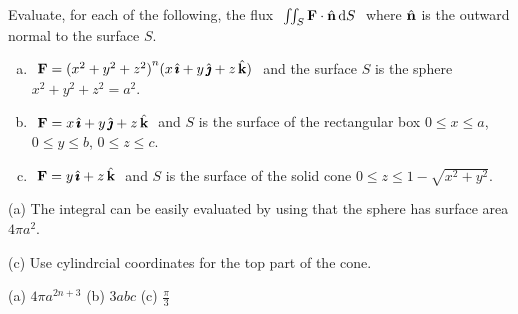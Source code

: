 \begin{question} 
Evaluate, for each of the following,
 the flux $\ \iint_S\mathbf{F}\cdot\hat{\mathbf{n}} \,\mathrm{d}S\ $ where $\hat{\mathbf{n}}$ is
the outward normal to the surface $S$.
\begin{enumerate}[(a)]
\item
$\ \vF={(x^2+y^2+z^2)}^n(x\,\hi+y\,\hj+z\,\hk)\ $ 
and the surface $S$ is the sphere $x^2+y^2+z^2=a^2$.
\item
$\ \mathbf{F}=x\,\hat{\pmb{\imath}}+y\,\hat{\pmb{\jmath}}+z\,\hat{\mathbf{k}}\ $ 
and $S$ is the surface of the rectangular box $0\le x\le a$, $0\le y\le
b$, $0\le z\le c$.
\item
$\ \mathbf{F}=y\,\hat{\pmb{\imath}}+z\,\hat{\mathbf{k}}\ $ 
and $S$ is the surface of the solid cone $0\le z\le 1-\sqrt{x^2+y^2}$.
\end{enumerate}
\end{question}

\begin{hint} 
(a) The integral can be easily evaluated by using that the sphere 
has surface area $4\pi a^2$.

(c) Use cylindrcial coordinates for the top part of the cone.
\end{hint}

\begin{answer} 
(a) $4\pi a^{2n+3}$\qquad
(b) $3abc$\qquad
(c) $\frac{\pi}{3}$
\end{answer}

